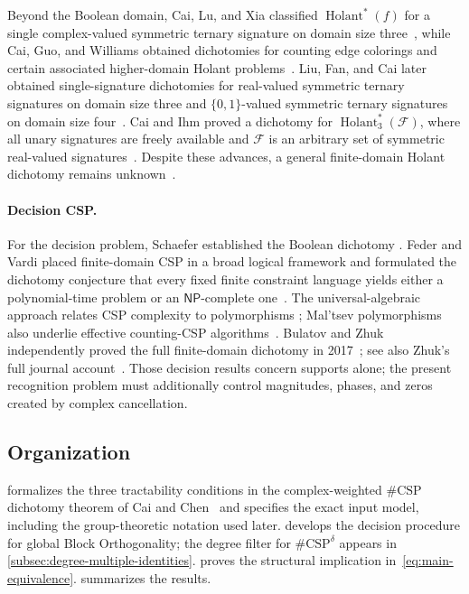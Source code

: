 \documentclass[11pt]{article}
\theoremstyle{plain}
\theoremstyle{definition}
\theoremstyle{remark}
\begin{document}
Beyond the Boolean domain, Cai, Lu, and Xia classified
$\operatorname{Holant}^{*}(f)$ for a single complex-valued symmetric ternary
signature on domain size three~\cite{CaiLuXia2013}, while Cai, Guo, and
Williams obtained dichotomies for counting edge colorings and certain
associated higher-domain Holant problems~\cite{CaiGuoWilliams2014}.  Liu,
Fan, and Cai later obtained
single-signature dichotomies for real-valued symmetric ternary signatures on
domain size three and $\{0,1\}$-valued symmetric ternary signatures on domain
size four~\cite{LiuFanCai2025}.  Cai and Ihm proved a
dichotomy for $\operatorname{Holant}^{*}_{3}(\mathcal F)$, where all unary
signatures are freely available and $\mathcal F$ is an arbitrary set of
symmetric real-valued signatures~\cite{CaiIhm2025}.
Despite these advances, a general finite-domain Holant dichotomy remains
unknown~\cite{CaiIhm2025}.

\paragraph{Decision CSP.}
For the decision problem, Schaefer established the Boolean dichotomy
\cite{Schaefer1978}.  Feder and Vardi placed finite-domain CSP in a broad
logical framework and formulated the dichotomy conjecture that every fixed
finite constraint language yields either a polynomial-time problem or an
$\mathsf{NP}$-complete one~\cite{FederVardi1998}.  The universal-algebraic
approach relates CSP complexity to polymorphisms
\cite{BulatovJeavonsKrokhin2005}; Mal'tsev polymorphisms also underlie
effective counting-CSP algorithms~\cite{DyerRicherby2013}.  Bulatov and Zhuk
independently proved the full finite-domain dichotomy in
2017~\cite{Bulatov2017,Zhuk2017}; see also Zhuk's
full journal account~\cite{Zhuk2020}.  Those decision results concern
supports alone; the present recognition problem must additionally control
magnitudes, phases, and zeros created by complex cancellation.




\subsection{Organization}

 formalizes the three tractability conditions in the
complex-weighted $\#\mathrm{CSP}$ dichotomy theorem of Cai and
Chen~\cite[Section~3.1]{CaiChen2017} and specifies the exact input model,
including the group-theoretic notation used later.
 develops the
decision procedure for global Block Orthogonality; the degree filter for
$\#\mathrm{CSP}^{\delta}$ appears in
\cref{subsec:degree-multiple-identities}.
 proves the structural
implication in~\eqref{eq:main-equivalence}.   summarizes
the results.
\end{document}
